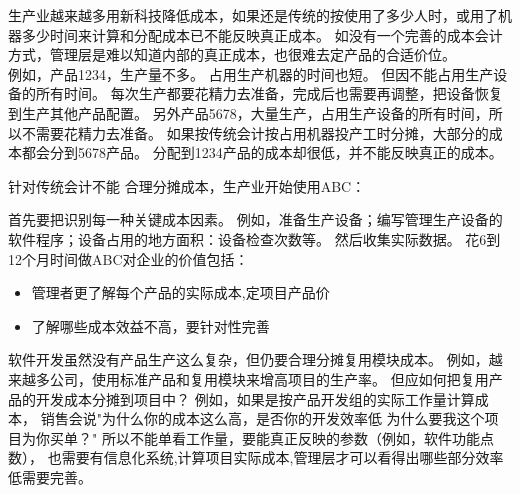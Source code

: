 生产业越来越多用新科技降低成本，如果还是传统的按使用了多少人时，或用了机器多少时间来计算和分配成本已不能反映真正成本。
如没有一个完善的成本会计方式，管理层是难以知道内部的真正成本，也很难去定产品的合适价位。\\
例如，产品1234，生产量不多。 占用生产机器的时间也短。
但因不能占用生产设备的所有时间。
每次生产都要花精力去准备，完成后也需要再调整，把设备恢复到生产其他产品配置。
另外产品5678，大量生产，占用生产设备的所有时间，所以不需要花精力去准备。
如果按传统会计按占用机器投产工时分摊，大部分的成本都会分到5678产品。
分配到1234产品的成本却很低，并不能反映真正的成本。

针对传统会计不能 合理分摊成本，生产业开始使用ABC：

首先要把识别每一种关键成本因素。
例如，准备生产设备；编写管理生产设备的软件程序；设备占用的地方面积：设备检查次数等。
然后收集实际数据。 花6到12个月时间做ABC对企业的价值包括：

\begin{itemize}
\tightlist
\item
  管理者更了解每个产品的实际成本,定项目产品价
\item
  了解哪些成本效益不高，要针对性完善
\end{itemize}

软件开发虽然没有产品生产这么复杂，但仍要合理分摊复用模块成本。
例如，越来越多公司，使用标准产品和复用模块来增高项目的生产率。
但应如何把复用产品的开发成本分摊到项目中？
例如，如果是按产品开发组的实际工作量计算成本，
销售会说"为什么你的成本这么高，是否你的开发效率低
为什么要我这个项目为你买单？"
所以不能单看工作量，要能真正反映的参数（例如，软件功能点数），
也需要有信息化系统,计算项目实际成本,管理层才可以看得出哪些部分效率低需要完善。


\cite{drucker1References1}
\cite{drucker1References2}
\cite{drucker1References3}


